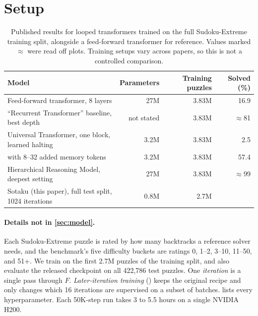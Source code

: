 \section{Setup}
\label{sec:setup}

\begin{table}[t]
\centering
\small
\caption{Published results for looped transformers trained on the full Sudoku-Extreme training split, alongside a feed-forward transformer for reference. Values marked $\approx$ were read off plots. Training setups vary across papers, so this is not a controlled comparison.}
\label{tab:baselines}
\begin{tabular}{@{}p{8.6cm}rrr@{}}
\toprule
Model & Parameters & Training puzzles & Solved (\%) \\
\midrule
Feed-forward transformer, 8 layers \citep{wang2025hierarchical} & 27M & 3.83M & 16.9 \\
``Recurrent Transformer'' baseline, best depth \citep{wang2025hierarchical} & not stated & 3.83M & $\approx$81 \\
Universal Transformer, one block, learned halting \citep{sapunov2026utmemory} & 3.2M & 3.83M & 2.5 \\
\quad with 8--32 added memory tokens & 3.2M & 3.83M & 57.4 \\
Hierarchical Reasoning Model, deepest setting \citep{wang2025hierarchical} & 27M & 3.83M & $\approx$99 \\
\midrule
Sotaku (this paper), full test split, 1024 iterations & 0.8M & 2.7M &  \\
\bottomrule
\end{tabular}
\end{table}

\paragraph{Details not in \autoref{sec:model}.} Each Sudoku-Extreme puzzle \citep{wang2025hierarchical} is rated by how many backtracks a reference solver needs, and the benchmark's five difficulty buckets are ratings 0, 1--2, 3--10, 11--50, and 51+. We train on the first 2.7M puzzles of the training split, and also evaluate the released checkpoint on all 422,786 test puzzles. One \emph{iteration} is a single pass through $F$. \emph{Later-iteration training} () keeps the original recipe and only changes which 16 iterations are supervised on a subset of batches.  lists every hyperparameter. Each 50K-step run takes 3 to 5.5 hours on a single NVIDIA H200.

